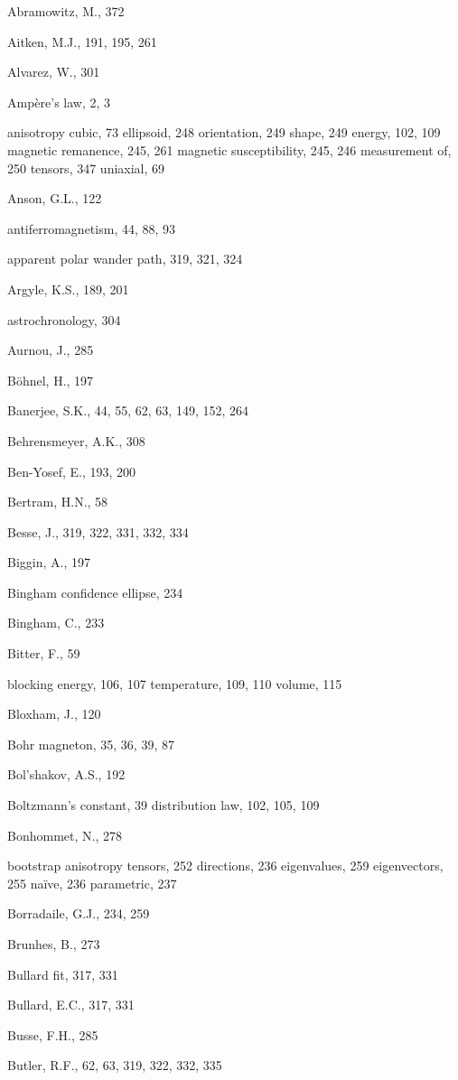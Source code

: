 \documentclass[,plain]{tauxe}
\begin{document}
\setcounter{page}{479}
\begin{theindex}

  \item Abramowitz, M., 372
  \item Aitken, M.J., 191, 195, 261
  \item Alvarez, W., 301
  \item Amp\`ere's law, 2, 3
  \item anisotropy
    \subitem cubic, 73
    \subitem ellipsoid, 248
      \subsubitem orientation, 249
      \subsubitem shape, 249
    \subitem energy, 102, 109
    \subitem magnetic remanence, 245, 261
    \subitem magnetic susceptibility, 245, 246
      \subsubitem measurement of, 250
    \subitem tensors, 347
    \subitem uniaxial, 69
  \item Anson, G.L., 122
  \item antiferromagnetism, 44, 88, 93
  \item apparent polar wander path, 319, 321, 324
  \item Argyle, K.S., 189, 201
  \item astrochronology, 304
  \item Aurnou, J., 285

  \indexspace

  \item B\"ohnel, H., 197
  \item Banerjee, S.K., 44, 55, 62, 63, 149, 152, 264
  \item Behrensmeyer, A.K., 308
  \item Ben-Yosef, E., 193, 200
  \item Bertram, H.N., 58
  \item Besse, J., 319, 322, 331, 332, 334
  \item Biggin, A., 197
  \item Bingham confidence ellipse, 234
  \item Bingham, C., 233
  \item Bitter, F., 59
  \item blocking
    \subitem energy, 106, 107
    \subitem temperature, 109, 110
    \subitem volume, 115
  \item Bloxham, J., 120
  \item Bohr magneton, 35, 36, 39, 87
  \item Bol'shakov, A.S., 192
  \item Boltzmann's
    \subitem constant, 39
    \subitem distribution law, 102, 105, 109
  \item Bonhommet, N., 278
  \item bootstrap
    \subitem anisotropy tensors, 252
    \subitem directions, 236
    \subitem eigenvalues, 259
    \subitem eigenvectors, 255
    \subitem na\"ive, 236
    \subitem parametric, 237
  \item Borradaile, G.J., 234, 259
  \item Brunhes, B., 273
  \item Bullard fit, 317, 331
  \item Bullard, E.C., 317, 331
  \item Busse, F.H., 285
  \item Butler, R.F., 62, 63, 319, 322, 332, 335


\end{theindex}
\end{document}
